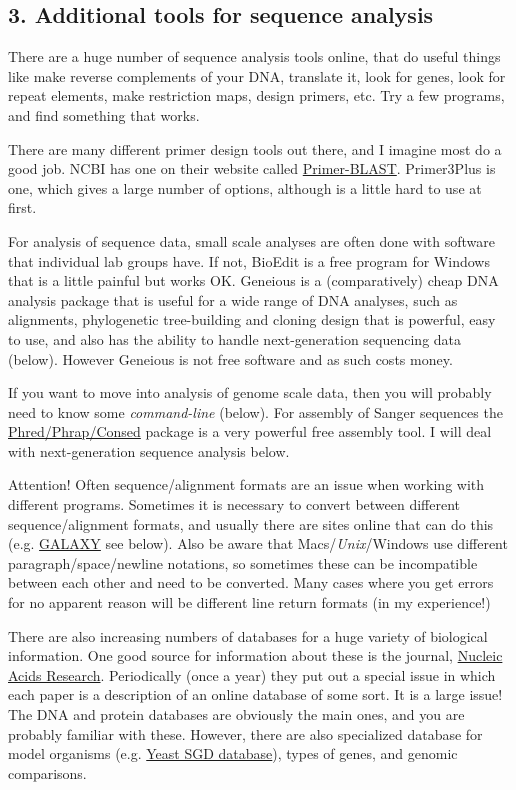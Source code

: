 \documentclass[]{article}
\begin{document}
\subsection{3. Additional tools for sequence
analysis}\label{additional-tools-for-sequence-analysis}

There are a huge number of sequence analysis tools online, that do
useful things like make reverse complements of your DNA, translate it,
look for genes, look for repeat elements, make restriction maps, design
primers, etc. Try a few programs, and find something that works.

There are many different primer design tools out there, and I imagine
most do a good job. NCBI has one on their website called
\href{http://www.ncbi.nlm.nih.gov/tools/primer-blast/}{Primer-BLAST}.
Primer3Plus is one, which gives a large number of options, although is a
little hard to use at first.

For analysis of sequence data, small scale analyses are often done with
software that individual lab groups have. If not, BioEdit is a free
program for Windows that is a little painful but works OK. Geneious is a
(comparatively) cheap DNA analysis package that is useful for a wide
range of DNA analyses, such as alignments, phylogenetic tree-building
and cloning design that is powerful, easy to use, and also has the
ability to handle next-generation sequencing data (below). However
Geneious is not free software and as such costs money.

If you want to move into analysis of genome scale data, then you will
probably need to know some \emph{command-line} (below). For assembly of
Sanger sequences the
\href{http://www.phrap.org/phredphrapconsed.html}{Phred/Phrap/Consed}
package is a very powerful free assembly tool. I will deal with
next-generation sequence analysis below.

Attention! Often sequence/alignment formats are an issue when working
with different programs. Sometimes it is necessary to convert between
different sequence/alignment formats, and usually there are sites online
that can do this (e.g. \href{https://usegalaxy.org/}{GALAXY} see below).
Also be aware that Macs/\emph{Unix}/Windows use different
paragraph/space/newline notations, so sometimes these can be
incompatible between each other and need to be converted. Many cases
where you get errors for no apparent reason will be different line
return formats (in my experience!)

There are also increasing numbers of databases for a huge variety of
biological information. One good source for information about these is
the journal, \href{http://nar.oxfordjournals.org/}{Nucleic Acids
Research}. Periodically (once a year) they put out a special issue in
which each paper is a description of an online database of some sort. It
is a large issue! The DNA and protein databases are obviously the main
ones, and you are probably familiar with these. However, there are also
specialized database for model organisms (e.g.
\href{http://www.yeastgenome.org/}{Yeast SGD database}), types of genes,
and genomic comparisons.
\end{document}
